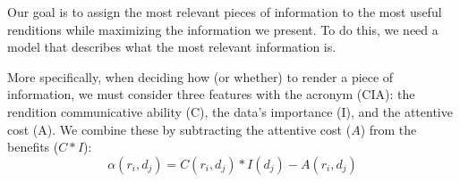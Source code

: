 Our goal is to assign the most relevant pieces of information to the most useful renditions while maximizing the information we present.  To do this, we need a model that describes what the most relevant information is.



More specifically, when deciding how (or whether) to render a piece of information, we must consider three features with the acronym (CIA): the rendition communicative ability (C), the data's importance (I), and the  attentive cost (A). We combine these by subtracting the attentive cost ($A$)  from the benefits ($C*I$): 
\begin{equation}
\label{eq::CIA}
\alpha(r_i, d_j) = C(r_i, d_j)*I(d_j)-A(r_i, d_j)
\end{equation}

